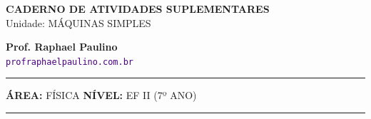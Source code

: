 \documentclass[twoside, 10pt, a4paper]{article}
\begin{document}
\thispagestyle{empty}
\color{Cinzablack}
\vspace*{-1.8cm}

\noindent
\begin{minipage}{\textwidth}
    \selectfont
    \noindent
    \begin{minipage}[t]{0.70\linewidth}
        {\Large \bfseries \MakeUppercase{Caderno de Atividades Suplementares}}\\[0.1cm]
        {\large \textmd{\textcolor{CinzaEscuro}{Unidade: MÁQUINAS SIMPLES}}}
    \end{minipage}%
    \begin{minipage}[t]{0.30\linewidth}
        \raggedleft
        \small \textbf{Prof. Raphael Paulino}\\
        \textsf{\small \textcolor{indigo}{\texttt{profraphaelpaulino.com.br}}}
    \end{minipage}
    
    \vspace{0.15cm}
    \noindent\rule{\linewidth}{1.2pt}
    \vspace{-0.1cm}
    \footnotesize\textsf{\textbf{ÁREA:} FÍSICA \hfill \textbf{NÍVEL:} EF II (7º ANO)}
    \vspace{0.1cm}
    \noindent\rule{\linewidth}{0.4pt}
\end{minipage}
\end{document}

